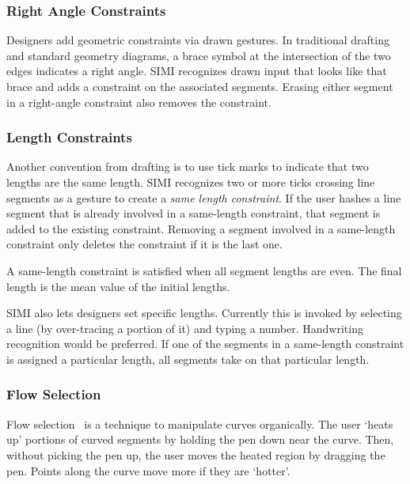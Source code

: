\documentclass{article}
\begin{document}
\subsubsection{Right Angle Constraints}

Designers add geometric constraints via drawn gestures. In traditional
drafting and standard geometry diagrams, a brace symbol at the
intersection of the two edges indicates a right angle. SIMI recognizes
drawn input that looks like that brace and adds a constraint on the
associated segments. Erasing either segment in a right-angle
constraint also removes the constraint.

\subsubsection{Length Constraints}

Another convention from drafting is to use tick marks to indicate that
two lengths are the same length. SIMI recognizes two or more ticks
crossing line segments as a gesture to create a \textit{same length
  constraint}. If the user hashes a line segment that is already
involved in a same-length constraint, that segment is added to the
existing constraint. Removing a segment involved in a same-length
constraint only deletes the constraint if it is the last one.

A same-length constraint is satisfied when all segment lengths are
even. The final length is the mean value of the initial lengths.

SIMI also lets designers set specific lengths. Currently this is
invoked by selecting a line (by over-tracing a portion of it) and
typing a number. Handwriting recognition would be preferred. If one of
the segments in a same-length constraint is assigned a particular
length, all segments take on that particular length.

\subsubsection{Flow Selection}

Flow selection~\cite{johnson-flow-selection} is a technique to
manipulate curves organically. The user `heats up' portions of curved
segments by holding the pen down near the curve. Then, without picking
the pen up, the user moves the heated region by dragging the
pen. Points along the curve move more if they are `hotter'.

\end{document}
